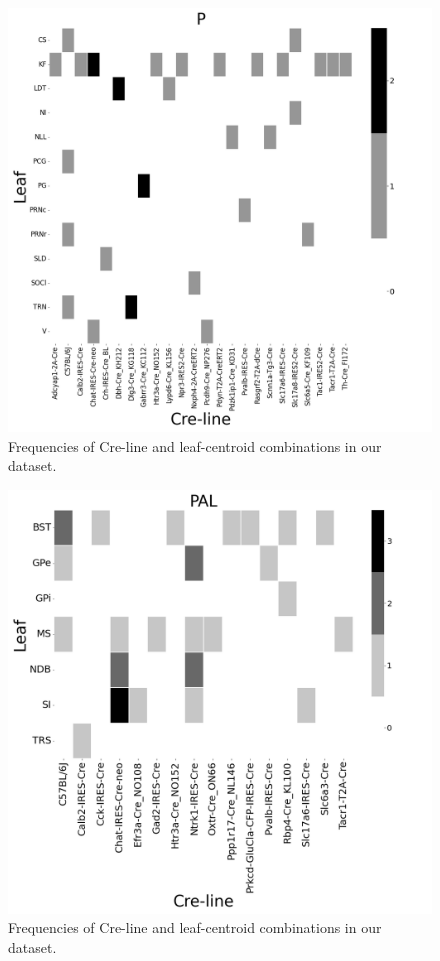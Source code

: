 \begin{figure}[H]
    \centering
    \includegraphics[width = 7in]{figs/P centroid density.png}
    \caption{Frequencies of Cre-line and leaf-centroid combinations in our dataset.}
    \label{fig:my_label}
\end{figure}
\newpage

\begin{figure}[H]
    \centering
    \includegraphics[width = 7in]{figs/PAL centroid density.png} 
    \caption{Frequencies of Cre-line and leaf-centroid combinations in our dataset.}
    \label{fig:my_label}
\end{figure}
\newpage

